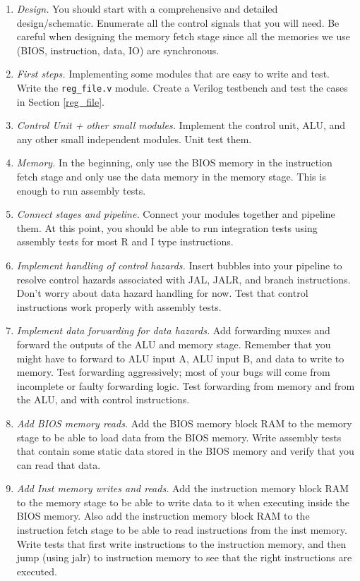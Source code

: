 \documentclass[11pt]{article}
\begin{document}
\begin{enumerate}
  \item \textit{Design.} You should start with a comprehensive and detailed design/schematic. Enumerate all the control signals that you will need. Be careful when designing the memory fetch stage since all the memories we use (BIOS, instruction, data, IO) are synchronous.
  \item \textit{First steps.} Implementing some modules that are easy to write and test. Write the \verb|reg_file.v| module. Create a Verilog testbench and test the cases in Section \ref{reg_file}.
  \item \textit{Control Unit + other small modules.} Implement the control unit, ALU, and any other small independent modules. Unit test them.
  \item \textit{Memory.} In the beginning, only use the BIOS memory in the instruction fetch stage and only use the data memory in the memory stage. This is enough to run assembly tests.
  \item \textit{Connect stages and pipeline.} Connect your modules together and pipeline them. At this point, you should be able to run integration tests using assembly tests for most R and I type instructions.
  \item \textit{Implement handling of control hazards.} Insert bubbles into your pipeline to resolve control hazards associated with JAL, JALR, and branch instructions. Don't worry about data hazard handling for now. Test that control instructions work properly with assembly tests.
  \item \textit{Implement data forwarding for data hazards.} Add forwarding muxes and forward the outputs of the ALU and memory stage. Remember that you might have to forward to ALU input A, ALU input B, and data to write to memory. Test forwarding aggressively; most of your bugs will come from incomplete or faulty forwarding logic. Test forwarding from memory and from the ALU, and with control instructions.
  \item \textit{Add BIOS memory reads.} Add the BIOS memory block RAM to the memory stage to be able to load data from the BIOS memory. Write assembly tests that contain some static data stored in the BIOS memory and verify that you can read that data.
  \item \textit{Add Inst memory writes and reads.} Add the instruction memory block RAM to the memory stage to be able to write data to it when executing inside the BIOS memory. Also add the instruction memory block RAM to the instruction fetch stage to be able to read instructions from the inst memory. Write tests that first write instructions to the instruction memory, and then jump (using jalr) to instruction memory to see that the right instructions are executed.

\end{enumerate}
\end{document}
